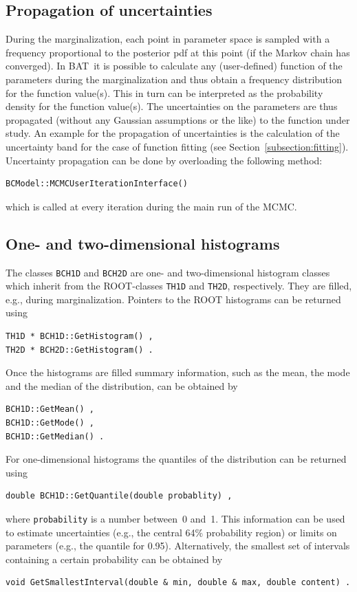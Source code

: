 \documentclass[11pt, a4paper]{article}
\newcommand{\BAT}{{\sc BAT}}
\begin{document}
\subsection{Propagation of uncertainties}

During the marginalization, each point in parameter space is sampled
with a frequency proportional to the posterior pdf at this point (if
the Markov chain has converged). In \BAT\ it is possible to calculate
any (user-defined) function of the parameters during the
marginalization and thus obtain a frequency distribution for the
function value(s). This in turn can be interpreted as the probability
density for the function value(s). The uncertainties on the parameters
are thus propagated (without any Gaussian assumptions or the like) to
the function under study. An example for the propagation of
uncertainties is the calculation of the uncertainty band for the case
of function fitting (see Section~\ref{subsection:fitting}).
Uncertainty propagation can be done by overloading the following
method:
%
\begin{verbatim}
BCModel::MCMCUserIterationInterface() 
\end{verbatim}
%
which is called at every iteration during the main run of the MCMC.


\subsection{One- and two-dimensional histograms} 

The classes \verb|BCH1D| and \verb|BCH2D| are one- and two-dimensional
histogram classes which inherit from the ROOT-classes \verb|TH1D| and
\verb|TH2D|, respectively. They are filled, e.g., during
marginalization. Pointers to the ROOT histograms can be returned using
%
\begin{verbatim}
TH1D * BCH1D::GetHistogram() ,
TH2D * BCH2D::GetHistogram() .
\end{verbatim}
%
Once the histograms are filled summary information, such as the mean,
the mode and the median of the distribution, can be obtained by
%
\begin{verbatim}
BCH1D::GetMean() , 
BCH1D::GetMode() , 
BCH1D::GetMedian() . 
\end{verbatim} 
%
For one-dimensional histograms the quantiles of the distribution can
be returned using
%
\begin{verbatim}
double BCH1D::GetQuantile(double probablity) , 
\end{verbatim}
%
where \verb|probability| is a number between~0 and~1. This information
can be used to estimate uncertainties (e.g., the central 64\%
probability region) or limits on parameters (e.g., the quantile for
0.95). Alternatively, the smallest set of intervals containing a
certain probability can be obtained by 
%
\begin{verbatim}
void GetSmallestInterval(double & min, double & max, double content) . 
\end{verbatim}
\end{document}
